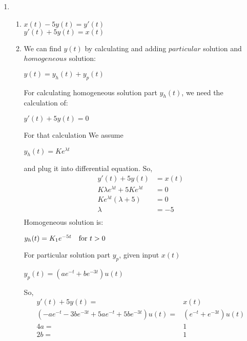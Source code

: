 \documentclass[10pt,a4paper, margin=1in]{article}
\begin{document}
\begin{enumerate}
\item %
    \begin{enumerate}
    \item %
    $x(t)-5y(t)=y'(t)$\\
    $y'(t)+5y(t)=x(t)$\\
    \item %
    We can find $y(t)$ by calculating and adding $particular$ solution and $homogeneous$ solution:
    \begin{center}
        $y(t)=y_h(t)+y_p(t)$
    \end{center}
    For calculating homogeneous solution part $y_h(t)$, we need the calculation of:
    \begin{center}
        $y'(t) + 5y(t) = 0$
    \end{center}
    For that calculation We assume 
    \begin{center}
        $y_h(t)=Ke^{\lambda t}$
    \end{center}
    and plug it into differential equation. So,
    \begin{equation}
    \begin{split}
       y'(t)+5y(t) & = x(t)  \\
        K\lambda e^{\lambda t}+5Ke^{\lambda t} & = 0  \\
        Ke^{\lambda t}(\lambda + 5)& = 0  \\
        \lambda &= -5  \\
    \end{split}
    \end{equation}
    Homogeneous solution is:
    \begin{center}
        $y_h(t)=K_1 e^{-5t} \text{\quad for } t>0$ \\
    \end{center} 
    For particular solution part $y_p$, given input $x(t)$
    \begin{center}
        $y_p(t)=(ae^{-t}+be^{-3t})u(t)$
    \end{center}
    So,
    \begin{equation}
        \begin{split}
             y'(t)+5y(t) = & x(t)\\
    (-ae^{-t}-3be^{-3t}+5ae^{-t}+5be^{-3t})u(t)= &(e^{-t}+e^{-3t})u(t)\\
    4a = &1\\
    2b = &1
        \end{split}

\end{equation}
\end{enumerate}
\end{enumerate}
\end{document}
